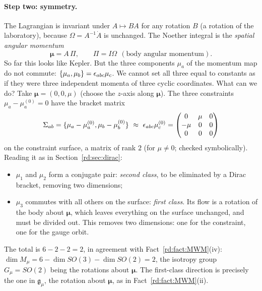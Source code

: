 \paragraph{Step two: symmetry.} The Lagrangian is invariant under $A\mapsto BA$ for any rotation $B$ (a rotation of the laboratory), because $\Omega=A^{-1}\dot A$ is unchanged. The Noether integral is the \emph{spatial angular momentum}
\begin{equation}\label{rd:Lspace}
\boldsymbol\mu=A\,\Pi,\qquad \Pi=I\Omega\ \ (\text{body angular momentum}).
\end{equation}
So far this looks like Kepler. But the three components $\mu_a$ of the momentum map do not commute: $\{\mu_a,\mu_b\}=\epsilon_{abc}\mu_c$. We cannot set all three equal to constants as if they were three independent momenta of three cyclic coordinates. What can we do? Take $\boldsymbol\mu=(0,0,\mu)$ (choose the $z$-axis along $\boldsymbol\mu$). The three constraints $\mu_a-\mu_a^{(0)}=0$ have the bracket matrix
\begin{equation}\label{rd:Sigma}
\Sigma_{ab}=\rdpb{\mu_a-\mu^{(0)}_a}{\mu_b-\mu^{(0)}_b}\ \rdwk\ \epsilon_{abc}\mu^{(0)}_c=\begin{pmatrix}0&\mu&0\\-\mu&0&0\\0&0&0\end{pmatrix}
\end{equation}
on the constraint surface, a matrix of rank $2$ (for $\mu\neq0$; checked symbolically). Reading it as in Section~\ref{rd:sec:dirac}:
\begin{itemize}
\item $\mu_1$ and $\mu_2$ form a conjugate pair: \emph{second class}, to be eliminated by a Dirac bracket, removing two dimensions;
\item $\mu_3$ commutes with all others on the surface: \emph{first class}. Its flow is a rotation of the body about $\boldsymbol\mu$, which leaves everything on the surface unchanged, and must be divided out. This removes two dimensions: one for the constraint, one for the gauge orbit.
\end{itemize}
The total is $6-2-2=2$, in agreement with Fact~\ref{rd:fact:MWM}(iv): $\dim M_\mu=6-\dim SO(3)-\dim SO(2)=2$, the isotropy group $G_\mu=SO(2)$ being the rotations about $\boldsymbol\mu$. The first-class direction is precisely the one in $\mathfrak g_\mu$, the rotation about $\boldsymbol\mu$, as in Fact~\ref{rd:fact:MWM}(ii).

